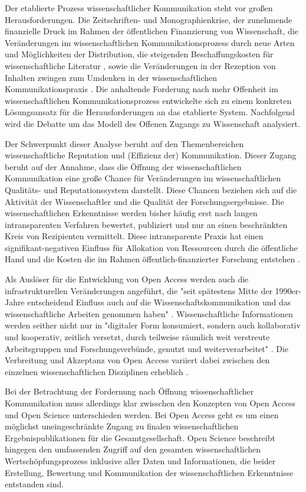 Der etablierte Prozess wissenschaftlicher Kommunikation steht vor großen Herausforderungen. Die Zeitschriften- und Monographienkrise, der zunehmende finanzielle Druck im Rahmen der öffentlichen Finanzierung von Wissenschaft, die Veränderungen im wissenschaftlichen Kommunikationsprozess durch neue Arten und Möglichkeiten der Distribution, die steigenden Beschaffungskosten für wissenschaftliche Literatur \cite{cite:17} \cite{muller_2010_open}, sowie die Veränderungen in der Rezeption von Inhalten \cite{holub_2013_reception} zwingen zum Umdenken in der wissenschaftlichen Kommunikationspraxis \cite{suchen}. Die anhaltende Forderung nach mehr Offenheit im wissenschaftlichen Kommunikationsprozess entwickelte sich zu einem konkreten Lösungsansatz für die Herausforderungen an das etablierte System. Nachfolgend wird die Debatte um das Modell des Offenen Zugangs zu Wissenschaft analysiert.

Der Schwerpunkt dieser Analyse beruht auf den Themenbereichen wissenschaftliche Reputation und (Effizienz der) Kommunikation. Dieser Zugang beruht auf der Annahme, dass die Öffnung der wissenschaftlichen Kommunikation eine große Chance für Veränderungen im wissenschaftlichen Qualitäts- und Reputationssystem darstellt. Diese Chancen beziehen sich auf die Aktivität der Wissenschaftler und die Qualität der Forschungsergebnisse. Die wissenschaftlichen Erkenntnisse werden bisher häufig erst nach langen intransparenten Verfahren bewertet, publiziert und nur an einen beschränkten Kreis von Rezipienten vermittelt. Diese intransparente Praxis hat einen signifikant-negativen Einfluss für Allokation von Ressourcen durch die öffentliche Hand und die Kosten die im Rahmen öffentlich-finanzierter Forschung entstehen \cite{suchen}.

Als Auslöser für die Entwicklung von Open Access werden auch die infrastrukturellen Veränderungen angeführt, die "seit spätestens Mitte der 1990er-Jahre entscheidend Einfluss auch auf die Wissenschaftskommunikation und das wissenschaftliche Arbeiten genommen haben" \cite{schulze_2013_open}. Wissenschaftliche Informationen werden seither nicht nur in "digitaler Form konsumiert, sondern auch kollaborativ und kooperativ, zeitlich versetzt, durch teilweise räumlich weit verstreute Arbeitsgruppen und Forschungsverbünde, genutzt und weiterverarbeitet" \cite{schulze_2013_open}. Die Verbreitung und Akzeptanz von Open Access variiert dabei zwischen den einzelnen wissenschaftlichen Disziplinen erheblich \cite{cite:21a}.

Bei der Betrachtung der Fordernung nach Öffnung wissenschaftlicher Kommunikation muss allerdings klar zwisschen den Konzepten von Open Access und Open Science unterschieden werden. Bei Open Access geht es um einen möglichst uneingeschränkte Zugang zu finalen wissenschaftlichen Ergebnispublikationen für die Gesamtgesellschaft. Open Science beschreibt hingegen den umfassenden Zugriff auf den gesamten wissenschaftlichen Wertschöpfungsprozess inklusive aller Daten und Informationen, die beider Erstellung, Bewertung und Kommunikation der wissenschaftlichen Erkenntnisse entstanden sind.


